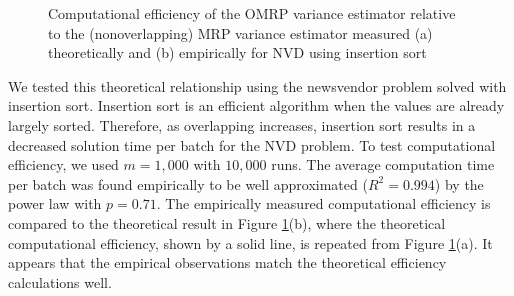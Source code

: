 \documentclass[12pt]{article}
\begin{document}
\begin{figure}[thb!]
	\centering
		\caption{
		Computational efficiency of the OMRP variance estimator relative to the (nonoverlapping) MRP variance estimator measured
		(a) theoretically and
		(b) empirically for NVD using insertion sort
		}
\label{fig:efficiency}
\end{figure}


We tested this theoretical relationship using the newsvendor problem solved with insertion sort.
Insertion sort is an efficient algorithm when the values are already largely sorted. 
Therefore, as overlapping increases, insertion sort results in a decreased solution time per batch for the NVD problem. 
To test computational efficiency, we used $m = 1,000$ with $10,000$ runs.
The average computation time per batch was found empirically to be well approximated ($R^2 = 0.994$) by the power law with $p = 0.71$.
The empirically measured computational efficiency is compared to the theoretical result in Figure \ref{fig:efficiency}(b), where the theoretical computational efficiency, shown by a solid line, is repeated from Figure \ref{fig:efficiency}(a).
It appears that the empirical observations match the theoretical efficiency calculations well. 
\end{document}
